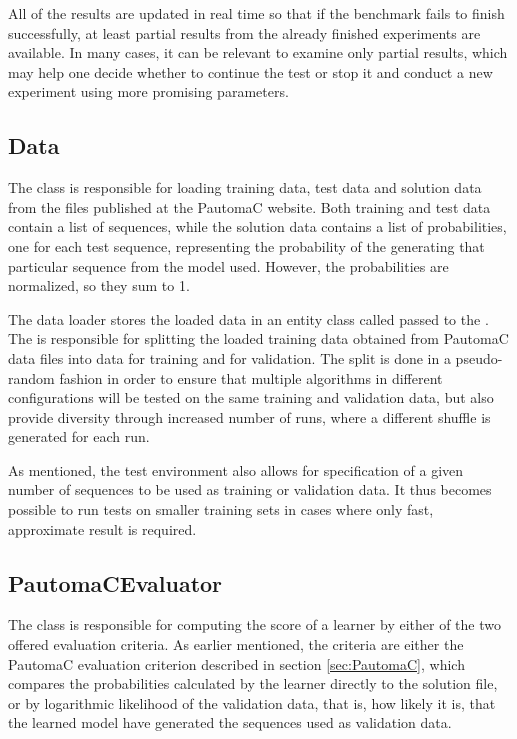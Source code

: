 All of the results are updated in real time so that if the benchmark fails to finish successfully, at least partial results from the already finished experiments are available. In many cases, it can be relevant to examine only partial results, which may help one decide whether to continue the test or stop it and conduct a new experiment using more promising parameters.

\subsection{Data}
The  class is responsible for loading training data, test data and solution data from the files published at the PautomaC website. Both training and test data contain a list of sequences, while the solution data contains a list of probabilities, one for each test sequence, representing the probability of the generating that particular sequence from the model used. However, the probabilities are normalized, so they sum to 1.

The data loader stores the loaded data in an entity class called  passed to the . The  is responsible for splitting the loaded training data obtained from PautomaC data files into data for training and for validation. The split is done in a pseudo-random fashion in order to ensure that multiple algorithms in different configurations will be tested on the same training and validation data, but also provide diversity through increased number of runs, where a different shuffle is generated for each run.

As mentioned, the test environment also allows for specification of a given number of sequences to be used as training or validation data. It thus becomes possible to run tests on smaller training sets in cases where only fast, approximate result is required.

\subsection{PautomaCEvaluator}
The  class is responsible for computing the score of a learner by either of the two offered evaluation criteria. As earlier mentioned, the criteria are either the PautomaC evaluation criterion described in section \ref{sec:PautomaC}, which compares the probabilities calculated by the learner directly to the solution file, or by logarithmic likelihood of the validation data, that is, how likely it is, that the learned model have generated the sequences used as validation data.

